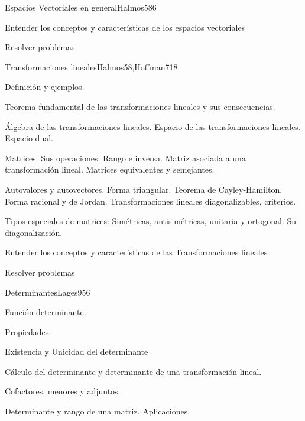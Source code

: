 \begin{sumilla}
\begin{unit}{Espacios Vectoriales en general}{Halmos58}{6}
   \begin{objetivos}
         \item  Entender los conceptos y caracter\'isticas de los espacios vectoriales
         \item  Resolver problemas
   \end{objetivos}
\end{unit}

\begin{unit}{Transformaciones lineales}{Halmos58,Hoffman71}{8}
   \begin{topicos}
         \item  Definici\'on y ejemplos.
	 \item  Teorema fundamental de las transformaciones lineales y sus consecuencias.
         \item  \'Algebra de las transformaciones lineales. Espacio de las transformaciones lineales. Espacio dual.
	 \item  Matrices. Sus operaciones. Rango e inversa. Matriz asociada a una transformaci\'on lineal. Matrices equivalentes y semejantes.
         \item  Autovalores y autovectores. Forma triangular. Teorema de Cayley-Hamilton. Forma racional y de  Jordan. Transformaciones lineales diagonalizables, criterios.
	 \item  Tipos especiales de matrices: Sim\'etricas, antisim\'etricas, unitaria y ortogonal. Su diagonalizaci\'on.
   \end{topicos}

   \begin{objetivos}
         \item  Entender los conceptos y caracter\'isticas de las Transformaciones lineales
         \item  Resolver problemas
   \end{objetivos}
\end{unit}

\begin{unit}{Determinantes}{Lages95}{6}
   \begin{topicos}
         \item  Funci\'on determinante.
	 \item  Propiedades.
         \item  Existencia y Unicidad del determinante
	 \item  C\'alculo del determinante y determinante de una transformaci\'on lineal.
         \item  Cofactores, menores y adjuntos.
	\item Determinante y rango de una matriz. Aplicaciones.
   \end{topicos}


\end{unit}
\end{sumilla}
